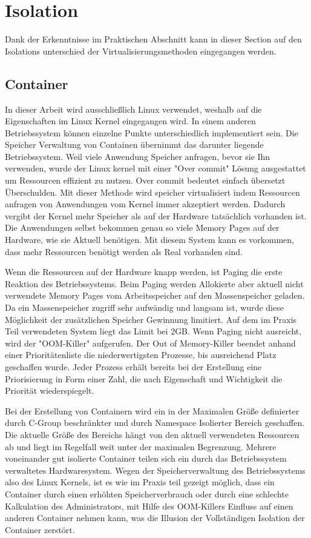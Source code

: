 \thispagestyle{empty}
\section{Isolation}
Dank der Erkenntnisse im Praktischen Abschnitt kann in dieser Section auf den Isolations unterschied der Virtualisierungsmethoden eingegangen werden.

\subsection{Container}
In dieser Arbeit wird ausschließlich Linux verwendet, weshalb auf die Eigenschaften im Linux Kernel eingegangen wird. In einem anderen Betriebssystem können einzelne Punkte unterschiedlich implementiert sein. Die Speicher Verwaltung von Containen übernimmt das darunter liegende Betriebssystem. Weil viele Anwendung Speicher anfragen, bevor sie Ihn verwenden, wurde der Linux kernel mit einer "Over commit" Lösung ausgestattet um Ressourcen effizient zu nutzen. Over commit bedeutet einfach übersetzt Überschulden. Mit dieser Methode wird speicher virtualisiert indem Ressourcen anfragen von Anwendungen vom Kernel immer akzeptiert werden. Dadurch vergibt der Kernel mehr Speicher als auf der Hardware tatsächlich vorhanden ist. Die Anwendungen selbst bekommen genau so viele Memory Pages auf der Hardware, wie sie Aktuell benötigen. Mit diesem System kann es vorkommen, dass mehr Ressourcen benötigt werden als Real vorhanden sind. 

Wenn die Ressourcen auf der Hardware knapp werden, ist Paging die erste Reaktion des Betriebssystems. Beim Paging werden Allokierte aber aktuell nicht verwendete Memory Pages vom Arbeitsspeicher auf den Massenspeicher geladen. Da ein Massenspeicher zugriff sehr aufwändig und langsam ist, wurde diese Möglichkeit der zusätzlichen Speicher Gewinnung limitiert. Auf dem im Praxis Teil verwendeten System liegt das Limit bei 2GB. Wenn Paging nicht ausreicht, wird der "OOM-Killer" aufgerufen. Der Out of Memory-Killer beendet anhand einer Prioritätenliste die niederwertigsten Prozesse, bis ausreichend Platz geschaffen wurde. Jeder Prozess erhält bereits bei der Erstellung eine Priorisierung in Form einer Zahl, die nach Eigenschaft und Wichtigkeit die Priorität wiederspiegelt.

Bei der Erstellung von Containern wird ein in der Maximalen Größe definierter durch C-Group beschränkter und durch Namespace Isolierter Bereich geschaffen. Die aktuelle Größe des Bereichs hängt von den aktuell verwendeten Ressourcen ab und liegt im Regelfall weit unter der maximalen Begrenzung. Mehrere voneinander gut isolierte Container teilen sich ein durch das Betriebssystem verwaltetes Hardwaresystem. Wegen der Speicherverwaltung des Betriebssystems also des Linux Kernels, ist es wie im Praxis teil gezeigt möglich, dass ein Container durch einen erhöhten Speicherverbrauch oder durch eine schlechte Kalkulation des Administrators, mit Hilfe des OOM-Killers Einfluss auf einen anderen Container nehmen kann, was die Illusion der Vollständigen Isolation der Container zerstört.



